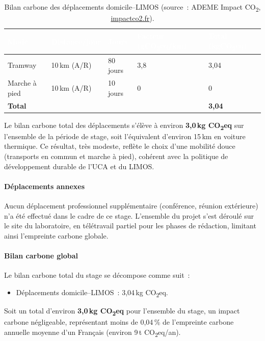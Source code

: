 \documentclass[11pt,a4paper]{article}
\begin{document}
\begin{table}[H]
\centering
\begin{tabularx}{\linewidth}{L{3.5cm} C{2cm} C{2cm} C{2.5cm} C{2.5cm}}
\toprule
{}
\textcolor{white}{\textbf{Mode}} &
\textcolor{white}{\textbf{Distance/jour}} &
\textcolor{white}{\textbf{Jours}} &
\textcolor{white}{\textbf{Facteur (gCO\textsubscript{2}eq/km)}} &
\textcolor{white}{\textbf{Total (kgCO\textsubscript{2}eq)}} \\
\midrule
Tramway        & 10\,km (A/R) & 80 jours  & 3,8  & 3,04 \\
Marche à pied  & 10\,km (A/R) & 10 jours  & 0    & 0    \\
\midrule
\textbf{Total} &             &           &      & \textbf{3,04} \\
\bottomrule
\end{tabularx}
\caption{Bilan carbone des déplacements domicile--LIMOS (source~: ADEME Impact CO\textsubscript{2}, \url{impactco2.fr}).}
\label{tab:carbone-deplacements}
\end{table}

Le bilan carbone total des déplacements s'élève à environ \textbf{3,0\,kg CO\textsubscript{2}eq} sur l'ensemble de la période de stage, soit l'équivalent d'environ 15\,km en voiture thermique. Ce résultat, très modeste, reflète le choix d'une mobilité douce (transports en commun et marche à pied), cohérent avec la politique de développement durable de l'UCA et du LIMOS.

\paragraph{Déplacements annexes}

Aucun déplacement professionnel supplémentaire (conférence, réunion extérieure) n'a été effectué dans le cadre de ce stage. L'ensemble du projet s'est déroulé sur le site du laboratoire, en télétravail partiel pour les phases de rédaction, limitant ainsi l'empreinte carbone globale.

\paragraph{Bilan carbone global}

Le bilan carbone total du stage se décompose comme suit~:
\begin{itemize}
  \item Déplacements domicile--LIMOS~: 3,04\,kg CO\textsubscript{2}eq.
\end{itemize}
Soit un total d'environ \textbf{3,0\,kg CO\textsubscript{2}eq} pour l'ensemble du stage, un impact carbone négligeable, représentant moins de 0,04\,\% de l'empreinte carbone annuelle moyenne d'un Français (environ 9\,t CO\textsubscript{2}eq/an).
\end{document}
